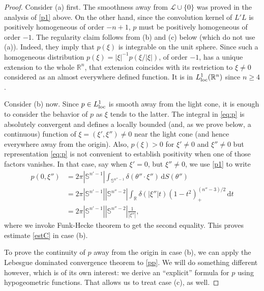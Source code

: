 \documentclass[11pt]{amsart}
\theoremstyle{definition}
\theoremstyle{remark}
\numberwithin{equation}{section}
\newcommand{\rb}{\mathbb{R}}
\renewcommand{\d}{\,\mathrm{d}}
\renewcommand{\sb}{\mathbb{S}}
\begin{document}
\begin{proof} 
Consider (a) first. 
The smoothness away from $\mathcal{L}\cup \{0\}$ was proved in the analysis of \eqref{p1} above.  On the other hand, since the convolution kernel of $L'L$ is positively homogeneous of order $-n+1$, $p$ must be positively homogeneous of order $-1$. The regularity claim follows from (b) and (c) below (which do not use (a)). Indeed, they imply that $p(\xi)$ is integrable on the unit sphere. Since such a homogeneous distribution $p(\xi)=|\xi|^{-1} p(\xi/|\xi|)$, of order $-1$,  has a unique extension to the whole $\rb^n$, that extension coincides with its restriction to $\xi\not=0$ considered as an almost everywhere defined function. It is in $L^1_{\rm loc}(\rb^n)$ since $n\ge4$. 

Consider (b) now. 
Since $p\in L^1_{\rm loc}$ is smooth away from the light cone, it is enough to consider the behavior of $p$ as $\xi$ tends to the latter. The integral in \eqref{eq:p} is absolutely convergent and defines a locally bounded (and, as we prove below, a continuous) function of $\xi= (\xi',\xi'')\not=0$ near the light cone (and hence everywhere away from the origin). Also, $p(\xi)>0$ for $\xi'\not=0$ and $\xi''\not=0$ but representation \eqref{eq:p} is not convenient to establish positivity when one of those factors vanishes. In that case, say when  $\xi'=0$, but $\xi'' \neq 0$, we use \eqref{p1} to write 
\begin{align*}
	p(0,\xi'') &= 2 \pi |\sb^{n'-1}| \int_{\sb^{n''-1}} \delta(\theta'' \cdot \xi'') \d S(\theta'') \\
	&= 2 \pi |\sb^{n'-1}| |\sb^{n''-2}| \int_{\rb} \delta(|\xi''| t) (1-t^2)_+^{(n''-3)/2} \d t \\
	&= 2\pi |\sb^{n'-1}| |\sb^{n''-2}| \frac{1}{|\xi''|},
\end{align*}
where we invoke Funk-Hecke theorem to get the second equality.
This proves estimate \eqref{estC} in case (b). 


To prove the continuity of $p$ away from the origin in case (b), we can apply the Lebesgue dominated convergence theorem to \eqref{pp}. We will do something different however, which is of its own interest: we  derive an ``explicit'' formula for $p$ using hypogeometric functions. That allows us to treat case (c), as well. 



\end{proof}
\end{document}
